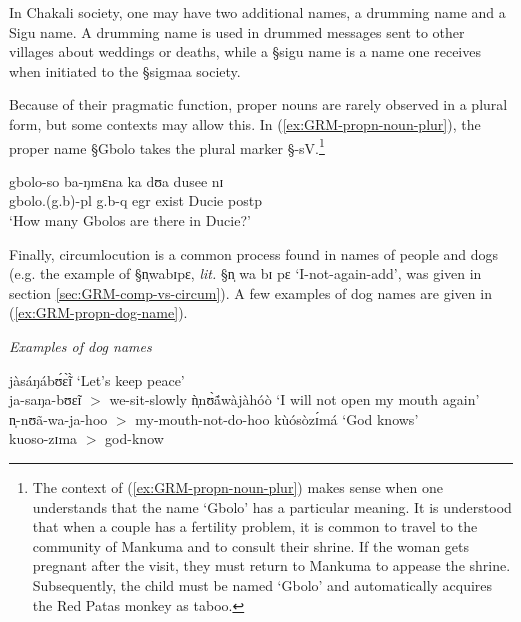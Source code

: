 In Chakali society, one may have two additional names, a drumming name and a
Sigu name. A drumming name is used in drummed messages sent to other villages
about weddings or deaths,  while a {\S  sigu} name is a name one receives
when initiated to the  {\S sigmaa} society. 

Because of their pragmatic function,  proper nouns  are rarely observed in a
plural form, but some contexts may allow this. In
(\ref{ex:GRM-propn-noun-plur}), the proper name {\S Gbolo} takes the plural
marker {\S -sV}.\footnote{The context of (\ref{ex:GRM-propn-noun-plur}) makes
sense when one understands that the name `Gbolo' has a particular meaning.  It
is understood that when a couple has a  fertility problem,  it is common to
travel to the community of Mankuma and to consult their shrine. If the woman
gets pregnant after the visit, they must return to Mankuma to appease the
shrine. Subsequently, the child must be named `Gbolo' and automatically acquires
 the Red Patas monkey as  taboo.}


  \begin{exe}
   \ex\label{ex:GRM-propn-noun-plur}
\gll  gbolo-so ba-ŋmɛna ka dʊa dusee nɪ\\
gbolo.({\sc g.}b)-{\sc pl}  {\sc g.}b-{\sc q} {\sc  egr} exist Ducie {\sc
postp}\\
\glt  `How many Gbolos are there in Ducie?' 
    \end{exe}

Finally, circumlocution is a common process found in names of people and dogs 
 (e.g. the example of {\S n̩wabɪpɛ}, 
{\it lit.}  {\S n̩ wa bɪ pɛ}  `I-not-again-add', was given in section
\ref{sec:GRM-comp-vs-circum}).   A few examples of dog names are given in
(\ref{ex:GRM-propn-dog-name}).


  \begin{exe}
   \ex\label{ex:GRM-propn-dog-name}{\it Examples of dog names}
 \begin{xlist}

 \ex\label{ex:GRM-propn-dog-name-1} 
{\I jàsáŋábʊ́ɛ̃̀ɪ̀} `Let's keep peace'\\ 
ja-saŋa-bʊɛ̃ɪ   $>$  we-sit-slowly  
 \ex\label{ex:GRM-propn-dog-name-2} 
{\I ǹ̩nʊ̀ã́wàjàhóò}   `I will not open my mouth again'  \\ 
 n̩-nʊã-wa-ja-hoo  $>$ my-mouth-not-do-hoo 
 \ex\label{ex:GRM-propn-dog-name-3} 
{\I kùósòzɪ́má}   `God knows' \\  
kuoso-zɪma $>$ god-know
\end{xlist}
\end{exe}




